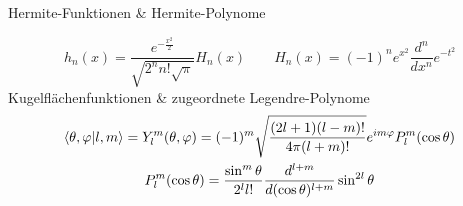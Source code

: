 Hermite-Funktionen \& Hermite-Polynome \begin{refsection}\end{refsection}
\begin{equation*}
	h_n(x)=\frac{e^{-\frac{x^2}{2}}}{\sqrt{2^nn!\sqrt{\pi}}}H_n(x) \qquad H_n(x)=(-1)^ne^{x^2}\frac{d^n}{dx^n}e^{-t^2}
\end{equation*}
Kugelflächenfunktionen \& zugeordnete Legendre-Polynome \cite[Glg. 6.59]{qm}
\begin{gather*}
	\braket{\theta,\varphi|l,m} = Y_l^m(\theta,\varphi) = (-1)^m\sqrt{\frac{(2l+1)(l-m)!}{4\pi(l+m)!}}e^{im\varphi}P_l^m(\cos\theta) \\
	P_l^m(\cos\theta) = \frac{\sin^m\theta}{2^ll!}\frac{d^{l+m}}{d(\cos\theta)^{l+m}}\sin^{2l}\theta
\end{gather*}

